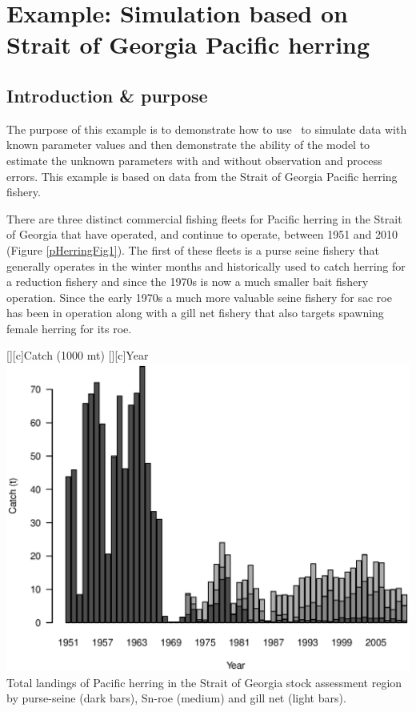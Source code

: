 \section{Example: Simulation based on Strait of Georgia Pacific herring}
\begin{multicols}{2}

\subsection{Introduction \& purpose}
The purpose of this example is to demonstrate how to use \iscam\ to simulate data with known parameter values and then demonstrate the ability of the model to estimate the unknown parameters with and without observation and process errors.  This example is based on data from the Strait of Georgia Pacific herring fishery.

There are three distinct commercial fishing fleets for Pacific herring in the Strait of Georgia that have operated, and continue to operate, between 1951 and 2010 (Figure \ref{pHerringFig1}).  The first of these fleets is a purse seine fishery that generally operates in the winter months and historically used to catch herring for a reduction fishery and since the 1970s is now a much smaller bait fishery operation.  Since the early 1970s a much more valuable seine fishery for sac roe has been in operation along with a gill net fishery that also targets spawning female herring for its roe.

\begin{figurehere}
	[][c]{Catch (1000 mt)}
	[][c]{Year}
	\includegraphics[width=\columnwidth]{iscamfigs/pHerringFig1.eps}\\
	\caption{Total landings of Pacific herring in the Strait of Georgia stock assessment region by purse-seine (dark bars), Sn-roe (medium) and gill net (light bars).}\label{pHerringFig1}
\end{figurehere}



\end{multicols}
